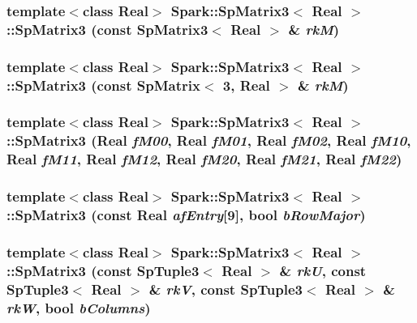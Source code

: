 \subsubsection{\setlength{\rightskip}{0pt plus 5cm}template$<$class Real$>$ {\bf Spark::Sp\-Matrix3}$<$ Real $>$::{\bf Sp\-Matrix3} (const {\bf Sp\-Matrix3}$<$ Real $>$ \& {\em rk\-M})}\label{classSpark_1_1SpMatrix3_a1}


\subsubsection{\setlength{\rightskip}{0pt plus 5cm}template$<$class Real$>$ {\bf Spark::Sp\-Matrix3}$<$ Real $>$::{\bf Sp\-Matrix3} (const {\bf Sp\-Matrix}$<$ 3, Real $>$ \& {\em rk\-M})}\label{classSpark_1_1SpMatrix3_a2}


\subsubsection{\setlength{\rightskip}{0pt plus 5cm}template$<$class Real$>$ {\bf Spark::Sp\-Matrix3}$<$ Real $>$::{\bf Sp\-Matrix3} (Real {\em f\-M00}, Real {\em f\-M01}, Real {\em f\-M02}, Real {\em f\-M10}, Real {\em f\-M11}, Real {\em f\-M12}, Real {\em f\-M20}, Real {\em f\-M21}, Real {\em f\-M22})}\label{classSpark_1_1SpMatrix3_a3}


\subsubsection{\setlength{\rightskip}{0pt plus 5cm}template$<$class Real$>$ {\bf Spark::Sp\-Matrix3}$<$ Real $>$::{\bf Sp\-Matrix3} (const Real {\em af\-Entry}[9], bool {\em b\-Row\-Major})}\label{classSpark_1_1SpMatrix3_a4}


\subsubsection{\setlength{\rightskip}{0pt plus 5cm}template$<$class Real$>$ {\bf Spark::Sp\-Matrix3}$<$ Real $>$::{\bf Sp\-Matrix3} (const {\bf Sp\-Tuple3}$<$ Real $>$ \& {\em rk\-U}, const {\bf Sp\-Tuple3}$<$ Real $>$ \& {\em rk\-V}, const {\bf Sp\-Tuple3}$<$ Real $>$ \& {\em rk\-W}, bool {\em b\-Columns})}\label{classSpark_1_1SpMatrix3_a5}


